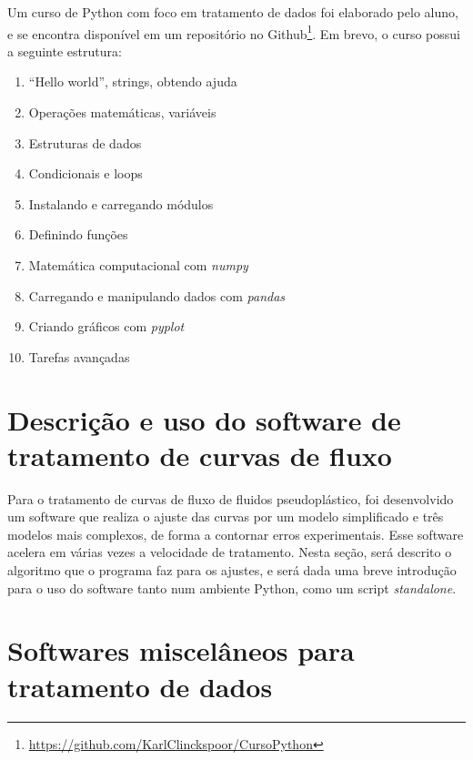 \begin{apendicesenv}
		Um curso de Python com foco em tratamento de dados foi elaborado pelo aluno, e se encontra disponível em um repositório no Github\footnote{\href{https://github.com/KarlClinckspoor/CursoPython}{https://github.com/KarlClinckspoor/CursoPython}}. Em brevo, o curso possui a seguinte estrutura:
		
		\begin{enumerate}
			\item ``Hello world'', strings, obtendo ajuda
			\item Operações matemáticas, variáveis
			\item Estruturas de dados
			\item Condicionais e loops
			\item Instalando e carregando módulos
			\item Definindo funções
			\item Matemática computacional com \emph{numpy}
			\item Carregando e manipulando dados com \emph{pandas}
			\item Criando gráficos com \emph{pyplot}
			\item Tarefas avançadas
		\end{enumerate}
		
	\chapter{Descrição e uso do software de tratamento de curvas de fluxo}
	
	Para o tratamento de curvas de fluxo de fluidos pseudoplástico, foi desenvolvido um software que realiza o ajuste das curvas por um modelo simplificado e três modelos mais complexos, de forma a contornar erros experimentais. Esse software acelera em várias vezes a velocidade de tratamento. Nesta seção, será descrito o algoritmo que o programa faz para os ajustes, e será dada uma breve introdução para o uso do software tanto num ambiente Python, como um script \emph{standalone}.
	
	\chapter{Softwares miscelâneos para tratamento de dados}
\end{apendicesenv}

%
%
%
%
%
%
%
